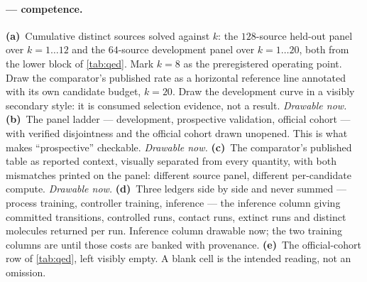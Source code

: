 \paragraph{ --- competence.}
\textbf{(a)}~Cumulative distinct sources solved against $k$: the $128$-source held-out panel over $k=1\ldots12$ and the $64$-source development panel over $k=1\ldots20$, both from the lower block of \cref{tab:qed}. Mark $k=8$ as the preregistered operating point. Draw the comparator's published rate as a horizontal reference line annotated with its own candidate budget, $k=20$. Draw the development curve in a visibly secondary style: it is consumed selection evidence, not a result. \emph{Drawable now.}
\textbf{(b)}~The panel ladder --- development, prospective validation, official cohort --- with verified disjointness and the official cohort drawn unopened. This is what makes ``prospective'' checkable. \emph{Drawable now.}
\textbf{(c)}~The comparator's published table as reported context, visually separated from every \method{} quantity, with both mismatches printed on the panel: different source panel, different per-candidate compute. \emph{Drawable now.}
\textbf{(d)}~Three ledgers side by side and never summed --- process training, controller training, inference --- the inference column giving committed transitions, controlled runs, contact runs, extinct runs and distinct molecules returned per run. Inference column drawable now; the two training columns are \XXX{} until those costs are banked with provenance.
\textbf{(e)}~The official-cohort row of \cref{tab:qed}, left visibly empty. A blank cell is the intended reading, not an omission.

